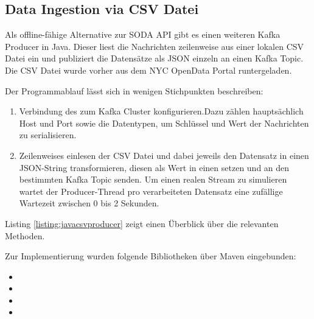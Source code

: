 \subsection{Data Ingestion via CSV Datei}
Als offline-fähige Alternative zur \ac{SODA} API gibt es einen weiteren Kafka Producer in Java.
Dieser liest die Nachrichten zeilenweise aus einer lokalen \ac{CSV} Datei ein und publiziert die Datensätze als \ac{JSON} einzeln an einen Kafka Topic.
Die \ac{CSV} Datei wurde vorher aus dem NYC OpenData Portal runtergeladen.

Der Programmablauf lässt sich in wenigen Stichpunkten beschreiben:
\begin{enumerate}
	\item Verbindung des  zum Kafka Cluster konfigurieren.Dazu zählen hauptsächlich Host und Port sowie die Datentypen, um Schlüssel und Wert der Nachrichten zu serialisieren.
	\item Zeilenweises einlesen der \ac{CSV} Datei und dabei jeweils den Datensatz in einen \ac{JSON}-String transformieren, diesen  als Wert in einen  setzen und an den bestimmten Kafka Topic senden. Um einen realen Stream zu simulieren wartet der Producer-Thread pro verarbeiteten Datensatz eine zufällige Wartezeit zwischen 0 bis 2 Sekunden.
\end{enumerate}

Listing \ref{listing:javacsvproducer} zeigt einen Überblick über die relevanten Methoden.



Zur Implementierung wurden folgende Bibliotheken über Maven eingebunden:
\begin{itemize}
	\item {}
	\item {}
	\item {}
	\item {}
\end{itemize}
